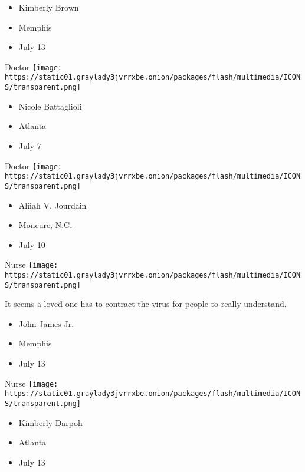 \begin{itemize}
\tightlist
\item
  Kimberly Brown
\item
  Memphis
\item
  July 13
\end{itemize}

\protect\hyperlink{item-nicole-battaglioli}{}

Doctor
\texttt{[image: https://static01.graylady3jvrrxbe.onion/packages/flash/multimedia/ICONS/transparent.png]}

\begin{itemize}
\tightlist
\item
  Nicole Battaglioli
\item
  Atlanta
\item
  July 7
\end{itemize}

\protect\hyperlink{item-aliiah-v-jourdain}{}

Doctor
\texttt{[image: https://static01.graylady3jvrrxbe.onion/packages/flash/multimedia/ICONS/transparent.png]}

\begin{itemize}
\tightlist
\item
  Aliiah V. Jourdain
\item
  Moncure, N.C.
\item
  July 10
\end{itemize}

\protect\hyperlink{item-john-james-jr}{}

Nurse
\texttt{[image: https://static01.graylady3jvrrxbe.onion/packages/flash/multimedia/ICONS/transparent.png]}

It seems a loved one has to contract the virus for people to really
understand.

\begin{itemize}
\tightlist
\item
  John James Jr.
\item
  Memphis
\item
  July 13
\end{itemize}

\protect\hyperlink{item-kimberly-darpoh}{}

Nurse
\texttt{[image: https://static01.graylady3jvrrxbe.onion/packages/flash/multimedia/ICONS/transparent.png]}

\begin{itemize}
\tightlist
\item
  Kimberly Darpoh
\item
  Atlanta
\item
  July 13
\end{itemize}

